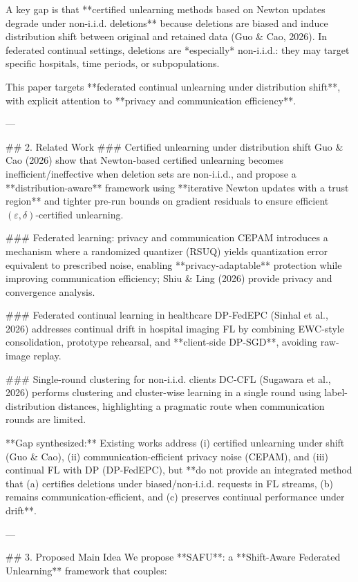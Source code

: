 A key gap is that **certified unlearning methods based on Newton updates degrade under non-i.i.d. deletions** because deletions are biased and induce distribution shift between original and retained data (Guo & Cao, 2026). In federated continual settings, deletions are *especially* non-i.i.d.: they may target specific hospitals, time periods, or subpopulations.

This paper targets **federated continual unlearning under distribution shift**, with explicit attention to **privacy and communication efficiency**.

---

## 2. Related Work
### Certified unlearning under distribution shift
Guo & Cao (2026) show that Newton-based certified unlearning becomes inefficient/ineffective when deletion sets are non-i.i.d., and propose a **distribution-aware** framework using **iterative Newton updates with a trust region** and tighter pre-run bounds on gradient residuals to ensure efficient \((\varepsilon,\delta)\)-certified unlearning.

### Federated learning: privacy and communication
CEPAM introduces a mechanism where a randomized quantizer (RSUQ) yields quantization error equivalent to prescribed noise, enabling **privacy-adaptable** protection while improving communication efficiency; Shiu & Ling (2026) provide privacy and convergence analysis.

### Federated continual learning in healthcare
DP-FedEPC (Sinhal et al., 2026) addresses continual drift in hospital imaging FL by combining EWC-style consolidation, prototype rehearsal, and **client-side DP-SGD**, avoiding raw-image replay.

### Single-round clustering for non-i.i.d. clients
DC-CFL (Sugawara et al., 2026) performs clustering and cluster-wise learning in a single round using label-distribution distances, highlighting a pragmatic route when communication rounds are limited.

**Gap synthesized:** Existing works address (i) certified unlearning under shift (Guo & Cao), (ii) communication-efficient privacy noise (CEPAM), and (iii) continual FL with DP (DP-FedEPC), but **do not provide an integrated method that (a) certifies deletions under biased/non-i.i.d. requests in FL streams, (b) remains communication-efficient, and (c) preserves continual performance under drift**.

---

## 3. Proposed Main Idea
We propose **SAFU**: a **Shift-Aware Federated Unlearning** framework that couples:

